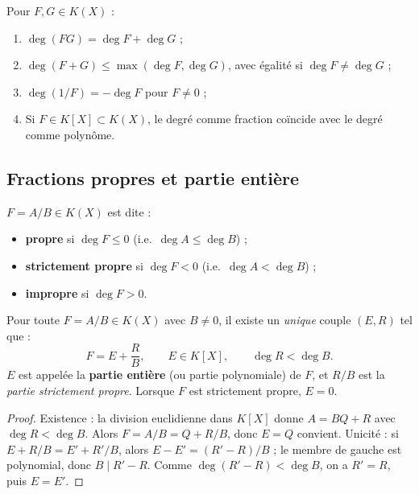 \begin{proposition}
Pour $F, G \in K(X)$ :
\begin{enumerate}
    \item $\deg(FG) = \deg F + \deg G$ ;
    \item $\deg(F + G) \le \max(\deg F, \deg G)$, avec égalité si $\deg F \neq \deg G$ ;
    \item $\deg(1/F) = -\deg F$ pour $F \neq 0$ ;
    \item Si $F \in K[X] \subset K(X)$, le degré comme fraction coïncide avec le degré comme polynôme.
\end{enumerate}
\end{proposition}

\subsection{Fractions propres et partie entière}

\begin{definition}
$F = A/B \in K(X)$ est dite :
\begin{itemize}
    \item \textbf{propre} si $\deg F \le 0$ (i.e.\ $\deg A \le \deg B$) ;
    \item \textbf{strictement propre} si $\deg F < 0$ (i.e.\ $\deg A < \deg B$) ;
    \item \textbf{impropre} si $\deg F > 0$.
\end{itemize}
\end{definition}

\begin{theoreme}
Pour toute $F = A/B \in K(X)$ avec $B \neq 0$, il existe un \emph{unique} couple $(E, R)$ tel que :
\[ F = E + \frac{R}{B}, \qquad E \in K[X], \qquad \deg R < \deg B. \]
$E$ est appelée la \textbf{partie entière} (ou partie polynomiale) de $F$, et $R/B$ est la \emph{partie strictement propre}. Lorsque $F$ est strictement propre, $E = 0$.
\end{theoreme}

\begin{proof}
Existence : la division euclidienne dans $K[X]$ donne $A = B Q + R$ avec $\deg R < \deg B$. Alors $F = A/B = Q + R/B$, donc $E = Q$ convient.
Unicité : si $E + R/B = E' + R'/B$, alors $E - E' = (R' - R)/B$ ; le membre de gauche est polynomial, donc $B \mid R' - R$. Comme $\deg(R' - R) < \deg B$, on a $R' = R$, puis $E = E'$.
\end{proof}

